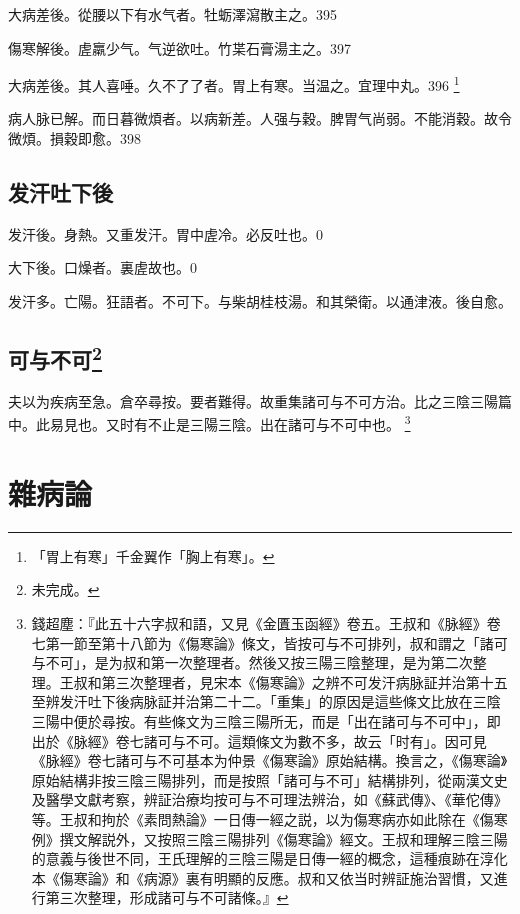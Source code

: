 大病差後。從腰以下有水气者。牡蛎澤瀉散主之。395

傷寒解後。虗羸少气。气逆欲吐。竹枼石膏湯主之。397

大病差後。其人喜唾。久不了了者。胃上有寒。当温之。宜理中丸。396
	\footnote{
		「胃上有寒」千金翼作「胸上有寒」。
	}

病人脉已解。而日暮微煩者。以病新差。人强与穀。脾胃气尚弱。不能消穀。故令微煩。損穀即愈。398

\chapter{发汗吐下後}

发汗後。身熱。又重发汗。胃中虗冷。必反吐也。0

大下後。口燥者。裏虗故也。0

发汗多。亡陽。狂語者。不可下。与柴胡桂枝湯。和其榮衛。以通津液。後自愈。

\chapter{可与不可\footnote{未完成。}}

夫以为疾病至急。倉卒尋按。要者難得。故重集諸可与不可方治。比之三陰三陽篇中。此易見也。又时有不止是三陽三陰。出在諸可与不可中也。
	\footnote{
		錢超塵：『此五十六字叔和語，又見《金匱玉函經》卷五。王叔和《脉經》卷七第一節至第十八節为《傷寒論》條文，皆按可与不可排列，叔和謂之「諸可与不可」，是为叔和第一次整理者。然後又按三陽三陰整理，是为第二次整理。王叔和第三次整理者，見宋本《傷寒論》之辨不可发汗病脉証并治第十五至辨发汗吐下後病脉証并治第二十二。「重集」的原因是這些條文比放在三陰三陽中便於尋按。有些條文为三陰三陽所无，而是「出在諸可与不可中」，即出於《脉經》卷七諸可与不可。這類條文为數不多，故云「时有」。因可見《脉經》卷七諸可与不可基本为仲景《傷寒論》原始結構。換言之，《傷寒論》原始結構非按三陰三陽排列，而是按照「諸可与不可」結構排列，從兩漢文史及醫學文獻考察，辨証治療均按可与不可理法辨治，如《蘇武傳》、《華佗傳》等。王叔和拘於《素問熱論》一日傳一經之説，以为傷寒病亦如此除在《傷寒例》撰文解説外，又按照三陰三陽排列《傷寒論》經文。王叔和理解三陰三陽的意義与後世不同，王氏理解的三陰三陽是日傳一經的概念，這種痕跡在淳化本《傷寒論》和《病源》裏有明顯的反應。叔和又依当时辨証施治習慣，又進行第三次整理，形成諸可与不可諸條。』
	}

\part{雜病論}

